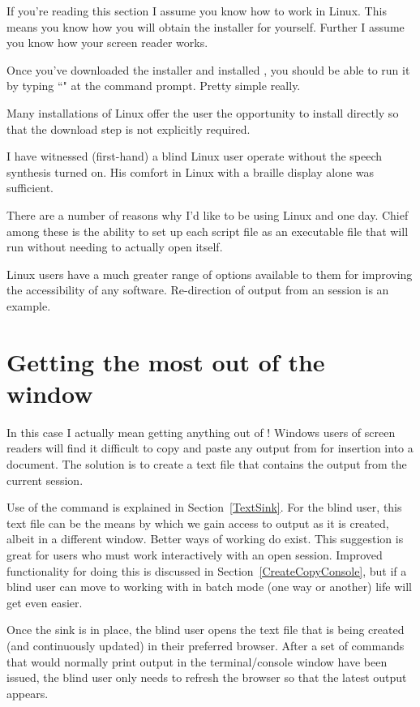 If you're reading this section I assume you know how to work in Linux. This means you know how you will obtain the installer for \R{} yourself. Further I assume you know how your screen reader works.

Once you've downloaded the installer and installed \R{}, you should be able to run it by typing ``" at the command prompt. Pretty simple really.

Many installations of Linux offer the user the opportunity to install directly so that the download step is not explicitly required.

I have witnessed (first-hand) a blind Linux user operate \R{} without the speech synthesis turned on. His comfort in Linux with a braille display alone was sufficient. 

There are a number of reasons why I'd like to be using Linux and \R{} one day. Chief among these is the ability to set up each \R{} script file as an executable file that will run without needing to actually open \R{} itself.

Linux users have a much greater range of options available to them for improving the accessibility of any software. Re-direction of output from an \R{} session is an example.

\section{Getting the most out of the \R{} window}\label{GettingTheMost}

In this case I actually mean getting anything out of \R{}! Windows users of screen readers will find it difficult to copy and paste any output from \R{} for insertion into a document. The solution is to create a text file that contains the output from the current session.

Use of the  command is explained in Section~\ref{TextSink}. For the blind user, this text file can be the means by which we gain access to \R{} output as it is created, albeit in a different window. Better ways of working do exist. This suggestion is great for users who must work interactively with an open \R{} session. Improved functionality for doing this is discussed in Section~\ref{CreateCopyConsole}, but if a blind user can move to working with \R{} in batch mode (one way or another) life will get even easier.

Once the sink is in place, the blind user opens the text file that is being created (and continuously updated) in their preferred browser. After a set of commands that would normally print output in the terminal/console window have been issued, the blind user only needs to refresh the browser so that the latest output appears.


